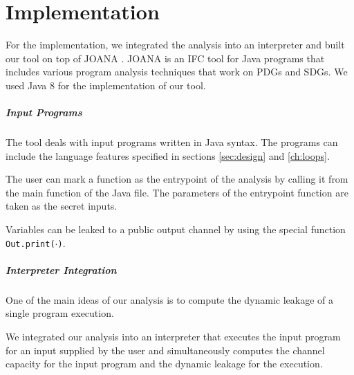 \chapter{Implementation}

For the implementation, we integrated the analysis into an interpreter and built our tool on top of JOANA \cite{joana}. JOANA is an IFC tool for Java programs that includes various program analysis techniques that work on PDGs and SDGs. We used Java 8 for the implementation of our tool.

\paragraph{Input Programs}
The tool deals with input programs written in Java syntax. The programs can include the language features specified in sections \ref{sec:design} and \ref{ch:loops}.

The user can mark a function as the entrypoint of the analysis by calling it from the main function of the Java file. The parameters of the entrypoint function are taken as the secret inputs.

Variables can be leaked to a public output channel by using the special function \texttt{Out.print($\cdot$)}.

\paragraph{Interpreter Integration}
One of the main ideas of our analysis is to compute the dynamic leakage of a single program execution.

We integrated our analysis into an interpreter that executes the input program for an input supplied by the user and simultaneously computes the channel capacity for the input program and the dynamic leakage for the execution.

